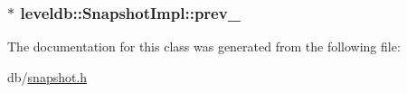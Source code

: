 \subsubsection[{prev\+\_\+}]{$\ast$ leveldb\+::\+Snapshot\+Impl\+::prev\+\_\+\hspace{0.3cm}{\ttfamily [private]}}\label{classleveldb_1_1_snapshot_impl_a562cbefac390343cf1d8cd543b9a7d32}


The documentation for this class was generated from the following file\+:\begin{DoxyCompactItemize}
\item 
db/\hyperlink{snapshot_8h}{snapshot.\+h}\end{DoxyCompactItemize}
